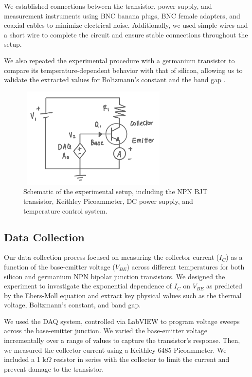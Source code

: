 \documentclass[12pt,letterpaper,twocolumn]{article}
\begin{document}
We established connections between the transistor, power supply, and measurement instruments using BNC banana plugs, BNC female adapters, and coaxial cables to minimize electrical noise. Additionally, we used simple wires and a short wire to complete the circuit and ensure stable connections throughout the setup.

We also repeated the experimental procedure with a germanium transistor to compare its temperature-dependent behavior with that of silicon, allowing us to validate the extracted values for Boltzmann’s constant and the band gap \cite{Collings}.


\begin{figure}[H]
\centering
\includegraphics[width=3in, height=2in]{Apparatus Final.jpg}
\caption{Schematic of the experimental setup, including the NPN BJT transistor, Keithley Picoammeter, DC power supply, and temperature control system.}
\label{fig:apparatus}
\end{figure}




\subsection{Data Collection}

Our data collection process focused on measuring the collector current (\( I_C \)) as a function of the base-emitter voltage (\( V_{BE} \)) across different temperatures for both silicon and germanium NPN bipolar junction transistors. We designed the experiment to investigate the exponential dependence of \( I_C \) on \( V_{BE} \) as predicted by the Ebers-Moll equation and extract key physical values such as the thermal voltage, Boltzmann’s constant, and band gap.

We used the DAQ system, controlled via LabVIEW to program voltage sweeps across the base-emitter junction. We varied the base-emitter voltage incrementally over a range of values to capture the transistor's response. Then, we measured the collector current using a Keithley 6485 Picoammeter. We included a 1 k$\Omega$ resistor in series with the collector to limit the current and prevent damage to the transistor.
\end{document}
